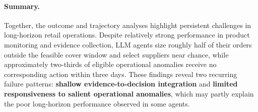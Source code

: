 \paragraph{Summary.}
Together, the outcome and trajectory analyses highlight persistent
challenges in long-horizon retail operations. Despite relatively
strong performance in product monitoring and evidence collection,
LLM agents size roughly half of their orders outside the feasible
cover window and select suppliers near chance, while
approximately two-thirds of eligible operational anomalies receive
no corresponding action within three days. These findings reveal
two recurring failure patterns:
\textbf{shallow evidence-to-decision integration} and
\textbf{limited responsiveness to salient operational anomalies},
which may partly explain the poor long-horizon performance
observed in some agents.